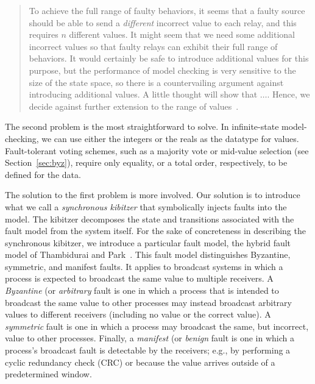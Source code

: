 \documentclass{llncs/llncs}
\begin{document}
\begin{quote}
To achieve the full range of faulty behaviors, it seems that a faulty source should be able to send a \emph{different} incorrect value to each relay, and this requires $n$ different values. It might seem that we need some additional incorrect values so that faulty relays can exhibit their full range of behaviors. It would certainly be safe to introduce additional values for this purpose, but the performance of model checking is very sensitive to the size of the state space, so there is a countervailing argument against introducing additional values. A little thought will show that $\ldots$. Hence, we decide against further extension to the range of values~\cite{Rushby:OM1}.
\end{quote}

The second problem is the most straightforward to solve. In infinite-state model-checking, we can use either the integers or the reals as the datatype for values. Fault-tolerant voting schemes, such as a majority vote or mid-value selection (see Section~\ref{sec:byz}), require only equality, or a total order, respectively, to be defined for the data.

The solution to the first problem is more involved. Our solution is to introduce what we call a \emph{synchronous kibitzer} that symbolically injects faults into the model. The kibitzer decomposes the state and transitions associated with the fault model from the system itself. For the sake of concreteness in describing the synchronous kibitzer, we introduce a particular fault model, the hybrid fault model of Thambidurai and Park~\cite{hybrid}. This fault model distinguishes Byzantine, symmetric, and manifest faults. It  applies to broadcast systems in which a process is expected to broadcast the same value to multiple receivers. A \emph{Byzantine} (or \emph{arbitrary} fault is one in which a process that is intended to broadcast the same value to other processes may instead broadcast arbitrary values to different receivers (including no value or the correct value). A \emph{symmetric} fault is one in which a process may broadcast the same, but incorrect, value to other processes. Finally, a \emph{manifest} (or \emph{benign} fault is one in which a process's broadcast fault is detectable by the receivers; e.g., by performing a cyclic redundancy check (CRC) or because the value arrives outside of a predetermined window.

\end{document}

